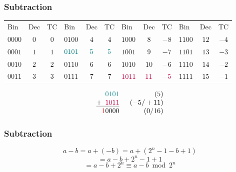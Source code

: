 \documentclass[aspectratio=169]{beamer}
\newif\iftransitions
\begin{document}
\begin{frame}
  \frametitle{Subtraction}
  
  \begin{tabular}{l c c|l c c|l c c|l c c}
  Bin & Dec & TC & Bin & Dec & TC & Bin & Dec & TC & Bin & Dec & TC \\
  $0000$ & $ 0$ & $0$ & $0100$ & $ 4$ & $4$ & $1000$ & $ 8$ & $-8$ & $1100$ & $12$ & $-4$ \\
  $0001$ & $ 1$ & $1$ & $\textcolor{teal}{0101}$ & $ \textcolor{teal}{5}$ & $\textcolor{teal}{5}$ & $1001$ & $ 9$ & $-7$ & $1101$ & $13$ & $-3$ \\
  $0010$ & $ 2$ & $2$ & $0110$ & $ 6$ & $6$ & $1010$ & $10$ & $-6$ & $1110$ & $14$ & $-2$ \\
  $0011$ & $ 3$ & $3$ & $0111$ & $ 7$ & $7$ & $\textcolor{purple}{1011}$ & $\textcolor{purple}{11}$ & $\textcolor{purple}{-5}$ & $1111$ & $15$ & $-1$ \\
  \end{tabular}
  
  \vspace{20pt}

  \begin{equation*}\begin{array}{c}
   \phantom{+9}\textcolor{teal}{0101} \phantom{999-+/99} (5) \\
   \underline{+\phantom{9}\textcolor{purple}{1011}} \phantom{999} (-5/+11) \\
   \phantom{+}\textcolor{red}{1}0000 \phantom{999-+} (0/16)
  \end{array}\end{equation*}
\end{frame}


\begin{frame}
  \frametitle{Subtraction}
  
  \begin{equation*}
    a - b = a + (-b) = a + (2^n - 1 - b + 1)
  \end{equation*} \iftransitions \pause \fi 
  \begin{equation*}
    = a - b + 2^n - 1 + 1
  \end{equation*} \iftransitions \pause \fi 
  \begin{equation*}
    = a - b + 2^n \equiv a - b \bmod 2^n
  \end{equation*}
\end{frame}
\end{document}
